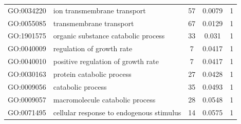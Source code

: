 \documentclass[10pt,letterpaper]{article}
\begin{document}
{\begin{table}[]
\begin{tabular}{llccc}
GO:0034220          & ion transmembrane transport                                                                & 57                                                     & 0.0079                                                & 1                                                  \\
GO:0055085          & transmembrane transport                                                                    & 67                                                     & 0.0129                                                & 1                                                  \\
GO:1901575          & organic substance catabolic process                                                        & 33                                                     & 0.031                                                 & 1                                                  \\
GO:0040009          & regulation of growth rate                                                                  & 7                                                      & 0.0417                                                & 1                                                  \\
GO:0040010          & positive regulation of growth rate                                                         & 7                                                      & 0.0417                                                & 1                                                  \\
GO:0030163          & protein catabolic process                                                                  & 27                                                     & 0.0428                                                & 1                                                  \\
GO:0009056          & catabolic process                                                                          & 35                                                     & 0.0493                                                & 1                                                  \\
GO:0009057          & macromolecule catabolic process                                                            & 28                                                     & 0.0548                                                & 1                                                  \\
GO:0071495          & cellular response to endogenous stimulus                                                   & 14                                                     & 0.0575                                                & 1                                                  \\

\end{tabular}
\end{table}}
\end{document}
